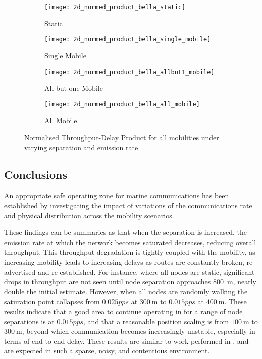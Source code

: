 

\begin{figure}[h]
  \begin{subfigure}[t]{0.5\textwidth}
    \centering
    \texttt{[image: 2d\_normed\_product\_bella\_static]}
    \caption{Static}
    \label{fig:2d_normed_product_bella_static}
  \end{subfigure}
  \begin{subfigure}[t]{0.5\textwidth}
    \centering
    \texttt{[image: 2d\_normed\_product\_bella\_single\_mobile]}
    \caption{Single Mobile}
    \label{fig:2d_normed_product_bella_single_mobile}
  \end{subfigure}
  
  \begin{subfigure}[t]{0.5\textwidth}
    \centering
    \texttt{[image: 2d\_normed\_product\_bella\_allbut1\_mobile]}
    \caption{All-but-one Mobile}
    \label{fig:2d_normed_product_bella_allbut1_mobile}
  \end{subfigure}
  \begin{subfigure}[t]{0.5\textwidth}
    \centering
    \texttt{[image: 2d\_normed\_product\_bella\_all\_mobile]}
    \caption{All Mobile}
    \label{fig:2d_normed_product_bella_all_mobile}
  \end{subfigure}
  \caption{Normalised Throughput-Delay Product for all mobilities under varying separation and emission rate}
  \label{fig:2d_normed_product}
\end{figure}


\subsection{Conclusions}

An appropriate safe operating zone for marine communications has been established by investigating the impact of variations of the communications rate and physical distribution across the mobility scenarios.

These findings can be summaries as that when the separation is increased, the emission rate at which the network becomes saturated decreases, reducing overall throughput. 
This throughput degradation is tightly coupled with the mobility, as increasing mobility leads to increasing delays as routes are constantly broken, re-advertised and re-established. 
For instance, where all nodes are static, significant drops in throughput are not seen until node separation approaches \SI{800}{\meter}, nearly double the initial estimate. 
However, when all nodes are randomly walking the saturation point collapses from $0.025pps$ at $\SI{300}{\meter}$ to $0.015pps$ at $\SI{400}{\meter}$.
These results indicate that a good area to continue operating in for a range of node separations is at $0.015pps$, and that a reasonable position scaling is from $\SI{100}{\meter}$ to $\SI{300}{\meter}$, beyond which communication becomes increasingly unstable, especially in terms of end-to-end delay.
These results are similar to work performed in \cite{Miquel2008}, and are expected in such a sparse, noisy, and contentious environment. 

